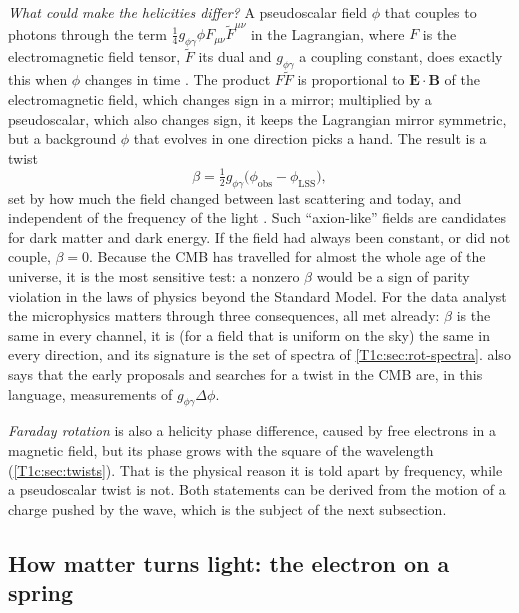 \emph{What could make the helicities differ?} A pseudoscalar field $\phi$ that couples to photons through the term $\frac14g_{\phi\gamma}\phi F_{\mu\nu}\tilde F^{\mu\nu}$ in the Lagrangian, where $F$ is the electromagnetic field tensor, $\tilde F$ its dual and $g_{\phi\gamma}$ a coupling constant, does exactly this when $\phi$ changes in time \cite{CarrollFieldJackiw1990,Carroll1998}. The product $F\tilde F$ is proportional to $\bm E\cdot\bm B$ of the electromagnetic field, which changes sign in a mirror; multiplied by a pseudoscalar, which also changes sign, it keeps the Lagrangian mirror symmetric, but a background $\phi$ that evolves in one direction picks a hand. The result is a twist
\begin{equation}
\beta=\tfrac12g_{\phi\gamma}\bigl(\phi_{\mathrm{obs}}-\phi_{\mathrm{LSS}}\bigr),
\label{T1c:eq:beta-phi}
\end{equation}
set by how much the field changed between last scattering and today, and independent of the frequency of the light \cite{Carroll1998,LueWangKamionkowski1999,MinamiKomatsu2020}. Such ``axion-like'' fields are candidates for dark matter and dark energy. If the field had always been constant, or did not couple, $\beta=0$. Because the CMB has travelled for almost the whole age of the universe, it is the most sensitive test: a nonzero $\beta$ would be a sign of parity violation in the laws of physics beyond the Standard Model. For the data analyst the microphysics matters through three consequences, all met already: $\beta$ is the same in every channel, it is (for a field that is uniform on the sky) the same in every direction, and its signature is the set of spectra of \cref{T1c:sec:rot-spectra}.  also says that the early proposals and searches for a twist in the CMB \cite{LueWangKamionkowski1999,Feng2006} are, in this language, measurements of $g_{\phi\gamma}\Delta\phi$.

\emph{Faraday rotation} is also a helicity phase difference, caused by free electrons in a magnetic field, but its phase grows with the square of the wavelength (\cref{T1c:sec:twists}). That is the physical reason it is told apart by frequency, while a pseudoscalar twist is not. Both statements can be derived from the motion of a charge pushed by the wave, which is the subject of the next subsection.

\subsection{How matter turns light: the electron on a spring}
\label{T1c:sec:lorentz}

